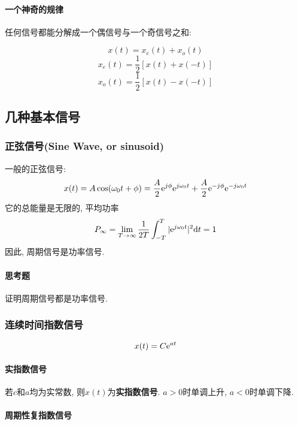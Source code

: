             \paragraph{一个神奇的规律}

                任何信号都能分解成一个偶信号与一个奇信号之和:

                \[x(t)=x_e(t)+x_o(t)\]
                \[x_e(t)=\frac{1}{2}[x(t)+x(-t)]\]
                \[x_o(t)=\frac{1}{2}[x(t)-x(-t)]\]

    \subsection{几种基本信号}

        \subsubsection{正弦信号(Sine Wave, or sinusoid)}

            一般的正弦信号:
            \[x(t)=A\cos(\omega_0t+\phi)=\frac{A}{2}\mathrm{e}^{j\phi}\mathrm{e}^{j\omega_0t}+\frac{A}{2}\mathrm{e}^{-j\phi}\mathrm{e}^{-j\omega_0t} \]
            它的总能量是无限的, 平均功率
            \[P_\infty =\lim_{T\to\infty}\frac{1}{2T}\int_{-T}^T|\mathrm{e}^{j\omega_0t}|^2\mathrm{d} t=1\]
            因此, 周期信号是功率信号.

            \paragraph{思考题}
            
                证明周期信号都是功率信号.

        \subsubsection{连续时间指数信号}

            \[x(t)=C\mathrm{e}^{at}\]

            \paragraph{实指数信号}

                若$c$和$a$均为实常数, 则$x(t)$为\textbf{实指数信号}. $a>0$时单调上升, $a<0$时单调下降.

            \paragraph{周期性复指数信号}


